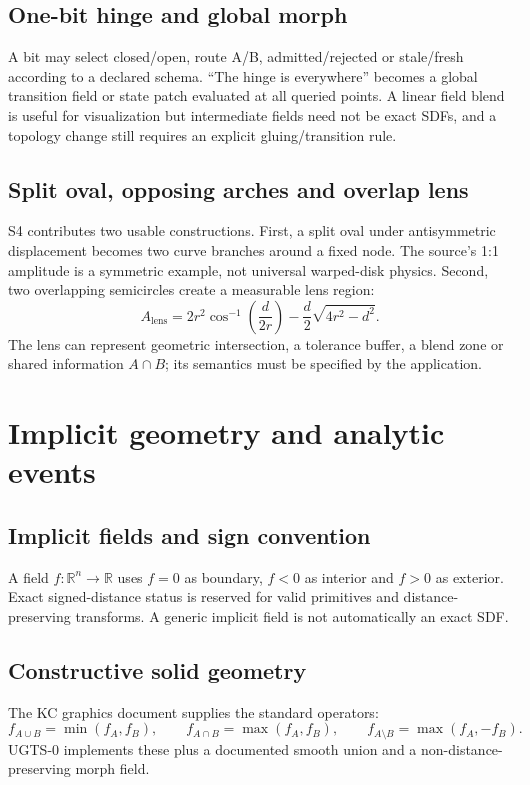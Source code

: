 \documentclass[10.5pt,a4paper,openany]{book}
\newcommand{\statusretain}{\tcbox[on line,boxsep=1pt,left=3pt,right=3pt,top=1pt,bottom=1pt,arc=2pt,colback=UGTSTeal,colframe=UGTSTeal,coltext=white,fontupper=\sffamily\bfseries\scriptsize]{RETAIN}}
\newcommand{\statustranslate}{\tcbox[on line,boxsep=1pt,left=3pt,right=3pt,top=1pt,bottom=1pt,arc=2pt,colback=UGTSGold,colframe=UGTSGold,coltext=UGTSNavy,fontupper=\sffamily\bfseries\scriptsize]{TRANSLATE}}
\begin{document}
\section{One-bit hinge and global morph}
\statusretain\quad A bit may select closed/open, route A/B, admitted/rejected or stale/fresh according to a declared schema. \statustranslate\quad ``The hinge is everywhere'' becomes a global transition field or state patch evaluated at all queried points. A linear field blend is useful for visualization but intermediate fields need not be exact SDFs, and a topology change still requires an explicit gluing/transition rule.

\section{Split oval, opposing arches and overlap lens}
S4 contributes two usable constructions. First, a split oval under antisymmetric displacement becomes two curve branches around a fixed node. The source's 1:1 amplitude is a symmetric example, not universal warped-disk physics. Second, two overlapping semicircles create a measurable lens region:
\[
A_{\text{lens}}=2r^2\cos^{-1}\!\left(\frac d{2r}\right)-\frac d2\sqrt{4r^2-d^2}.
\]
The lens can represent geometric intersection, a tolerance buffer, a blend zone or shared information $A\cap B$; its semantics must be specified by the application.

\chapter{Implicit geometry and analytic events}
\section{Implicit fields and sign convention}
\statusretain\quad A field $f:\mathbb R^n\to\mathbb R$ uses $f=0$ as boundary, $f<0$ as interior and $f>0$ as exterior. Exact signed-distance status is reserved for valid primitives and distance-preserving transforms. A generic implicit field is not automatically an exact SDF.

\section{Constructive solid geometry}
The KC graphics document supplies the standard operators:
\[
 f_{A\cup B}=\min(f_A,f_B),\qquad
 f_{A\cap B}=\max(f_A,f_B),\qquad
 f_{A\setminus B}=\max(f_A,-f_B).
\]
UGTS-0 implements these plus a documented smooth union and a non-distance-preserving morph field.
\end{document}
